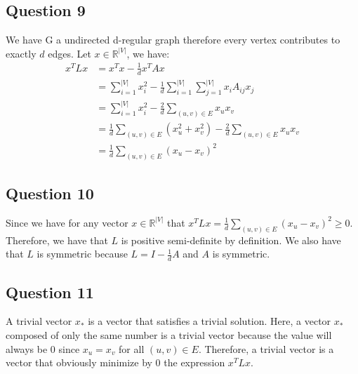 \documentclass{article}
\begin{document}
\subsection{Question 9}
We have G a undirected d-regular graph therefore every vertex contributes to exactly $d$ edges.
Let $x \in \mathbb{R}^{|V|}$, we have:
\begin{align*}
  x^T L x & = x^T x - \frac{1}{d} x^T A x                                                             \\
          & = \sum_{i=1}^{|V|} x_i^2 - \frac{1}{d} \sum_{i=1}^{|V|} \sum_{j=1}^{|V|} x_i A_{ij} x_j   \\
          & = \sum_{i=1}^{|V|} x_i^2 - \frac{2}{d} \sum_{(u,v) \in E} x_u x_v                         \\
          & = \frac{1}{d} \sum_{(u,v) \in E} (x_u^2 + x_v^2) - \frac{2}{d} \sum_{(u,v) \in E} x_u x_v \\
          & = \frac{1}{d} \sum_{(u,v) \in E} (x_u - x_v)^2
\end{align*}

\subsection{Question 10}
Since we have for any vector $x \in \mathbb{R}^{|V|}$ that $x^T L x = \frac{1}{d} \sum_{(u,v) \in E} (x_u - x_v)^2 \geq 0$. Therefore, we have that $L$ is positive semi-definite by definition. We also have that $L$ is symmetric because $L = I - \frac{1}{d} A$ and $A$ is symmetric.

\subsection{Question 11}
A trivial vector $x_*$ is a vector that satisfies a trivial solution. Here, a vector $x_*$ composed of only the same number is a trivial vector because the value will always be 0 since $x_u = x_v$ for all $(u,v) \in E$. Therefore, a trivial vector is a vector that obviously minimize by 0 the expression $x^T L x$.
\end{document}
